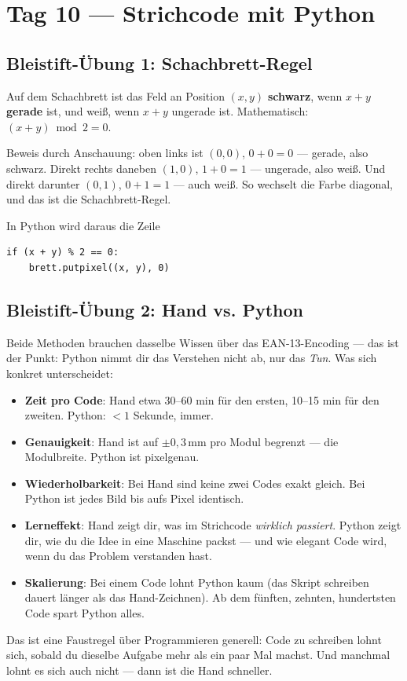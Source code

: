 \section*{Tag 10 — Strichcode mit Python}

\subsection*{Bleistift-Übung 1: Schachbrett-Regel}

Auf dem Schachbrett ist das Feld an Position $(x, y)$ \textbf{schwarz},
wenn $x + y$ \textbf{gerade} ist, und weiß, wenn $x + y$ ungerade ist.
Mathematisch: $(x + y) \bmod 2 = 0$.

Beweis durch Anschauung: oben links ist $(0, 0)$, $0 + 0 = 0$ — gerade,
also schwarz. Direkt rechts daneben $(1, 0)$, $1 + 0 = 1$ — ungerade,
also weiß. Und direkt darunter $(0, 1)$, $0 + 1 = 1$ — auch weiß. So
wechselt die Farbe diagonal, und das ist die Schachbrett-Regel.

In Python wird daraus die Zeile

\begin{verbatim}
if (x + y) % 2 == 0:
    brett.putpixel((x, y), 0)
\end{verbatim}

\subsection*{Bleistift-Übung 2: Hand vs. Python}

Beide Methoden brauchen dasselbe Wissen über das EAN-13-Encoding —
das ist der Punkt: Python nimmt dir das Verstehen nicht ab, nur das
\emph{Tun}. Was sich konkret unterscheidet:

\begin{itemize}
\item \textbf{Zeit pro Code}: Hand etwa 30--60 min für den ersten,
  10--15 min für den zweiten. Python: $< 1$ Sekunde, immer.
\item \textbf{Genauigkeit}: Hand ist auf $\pm 0{,}3$\,mm pro Modul
  begrenzt — die Modulbreite. Python ist pixelgenau.
\item \textbf{Wiederholbarkeit}: Bei Hand sind keine zwei Codes
  exakt gleich. Bei Python ist jedes Bild bis aufs Pixel identisch.
\item \textbf{Lerneffekt}: Hand zeigt dir, was im Strichcode
  \emph{wirklich passiert}. Python zeigt dir, wie du die Idee
  in eine Maschine packst — und wie elegant Code wird, wenn du
  das Problem verstanden hast.
\item \textbf{Skalierung}: Bei einem Code lohnt Python kaum (das
  Skript schreiben dauert länger als das Hand-Zeichnen). Ab dem
  fünften, zehnten, hundertsten Code spart Python alles.
\end{itemize}

Das ist eine Faustregel über Programmieren generell: Code zu schreiben
lohnt sich, sobald du dieselbe Aufgabe mehr als ein paar Mal machst.
Und manchmal lohnt es sich auch nicht — dann ist die Hand schneller.

